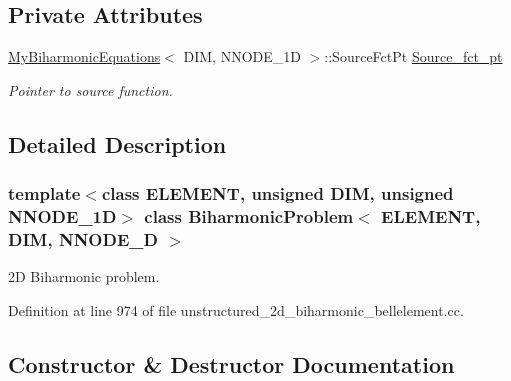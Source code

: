 \subsection*{Private Attributes}
\begin{DoxyCompactItemize}
\item 
\hyperlink{classoomph_1_1MyBiharmonicEquations}{My\+Biharmonic\+Equations}$<$ D\+IM, N\+N\+O\+D\+E\+\_\+1D $>$\+::Source\+Fct\+Pt \hyperlink{classBiharmonicProblem_a4e4e3dc027b6ccf7b0b4e519f84b0843}{Source\+\_\+fct\+\_\+pt}
\begin{DoxyCompactList}\small\item\em Pointer to source function. \end{DoxyCompactList}\end{DoxyCompactItemize}


\subsection{Detailed Description}
\subsubsection*{template$<$class E\+L\+E\+M\+E\+NT, unsigned D\+IM, unsigned N\+N\+O\+D\+E\+\_\+1D$>$\newline
class Biharmonic\+Problem$<$ E\+L\+E\+M\+E\+N\+T, D\+I\+M, N\+N\+O\+D\+E\+\_\+D $>$}

2D Biharmonic problem. 

Definition at line 974 of file unstructured\+\_\+2d\+\_\+biharmonic\+\_\+bellelement.\+cc.



\subsection{Constructor \& Destructor Documentation}
\mbox{\label{classBiharmonicProblem_a947d20f6658aa16bb92086a8ed025491}} 
